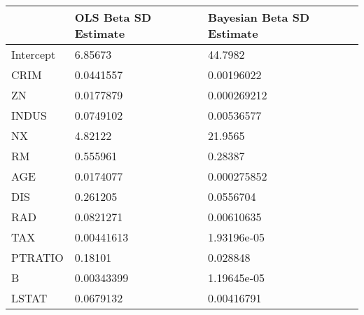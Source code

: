 \begin{tabular}{lll}
\hline
           & OLS Beta SD Estimate   & Bayesian Beta SD Estimate   \\
\hline
 Intercept & 6.85673                & 44.7982                     \\
 CRIM      & 0.0441557              & 0.00196022                  \\
 ZN        & 0.0177879              & 0.000269212                 \\
 INDUS     & 0.0749102              & 0.00536577                  \\
 NX        & 4.82122                & 21.9565                     \\
 RM        & 0.555961               & 0.28387                     \\
 AGE       & 0.0174077              & 0.000275852                 \\
 DIS       & 0.261205               & 0.0556704                   \\
 RAD       & 0.0821271              & 0.00610635                  \\
 TAX       & 0.00441613             & 1.93196e-05                 \\
 PTRATIO   & 0.18101                & 0.028848                    \\
 B         & 0.00343399             & 1.19645e-05                 \\
 LSTAT     & 0.0679132              & 0.00416791                  \\
\hline
\end{tabular}